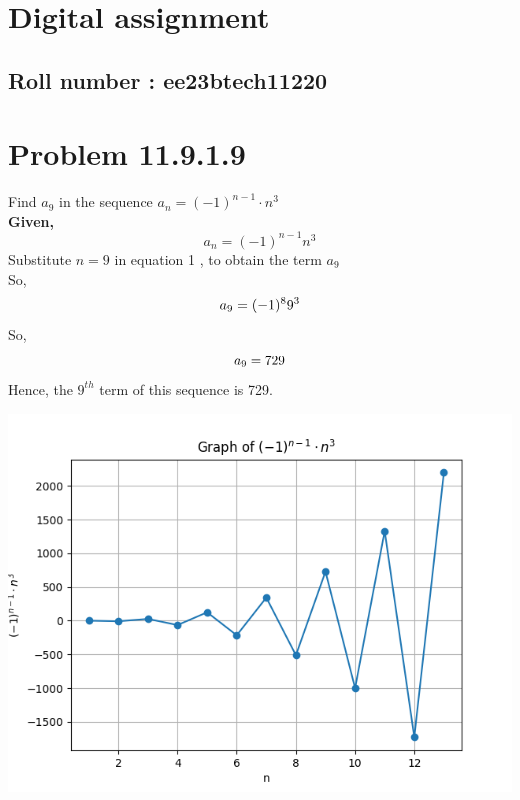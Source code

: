 \documentclass[12pt]{article}
\begin{document}
\section*{Digital assignment}
\subsection*{Roll number : ee23btech11220}


\section{\textbf{Problem 11.9.1.9}}
Find $a_{9}$ in the sequence $a_{n}=(-1)^{n-1}\cdot n^{3}$ \\

\textbf{Given,} 
\begin{equation}   a_{n}=(-1)^{n-1}n^{3} \end{equation}
Substitute $n=9$ in equation 1 , to obtain the term $a_{9}$ \\
So, \begin{equation}
    a_{9}=(-1)^{8}9^{3}\notag
\end{equation}
So, \begin{equation}
    a_{9}=729\notag
\end{equation}
Hence, the $9^{th}$ term of this sequence is 729.



\includegraphics[scale=0.8]{assignments/digital1/graphs/graph1.png}
\end{document}
